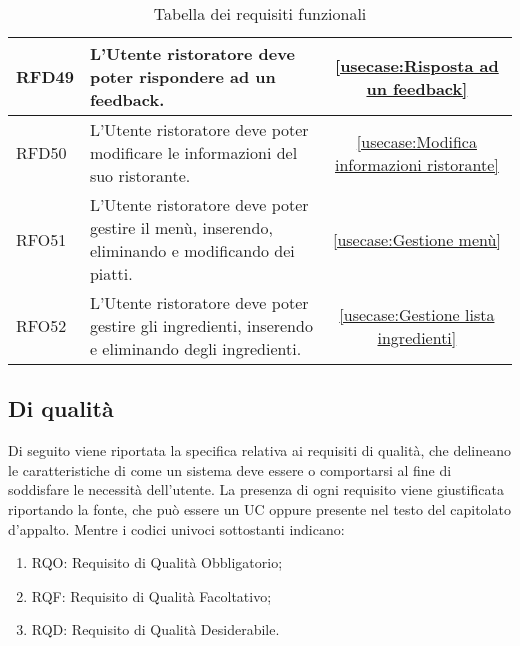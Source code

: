 \begin{table}[H]
\begin{tabularx}{\textwidth}{l|X|c}
		\hline
		RFD49       & L'Utente ristoratore deve poter rispondere ad un feedback.                                                              & \autoref{usecase:Risposta ad un feedback}            \\
		\hline
		RFD50       & L'Utente ristoratore deve poter modificare le informazioni del suo ristorante.                                          & \autoref{usecase:Modifica informazioni ristorante}   \\
		\hline
		RFO51       & L'Utente ristoratore deve poter gestire il menù, inserendo, eliminando e modificando dei piatti.                        & \autoref{usecase:Gestione menù}                      \\
		\hline
		RFO52       & L'Utente ristoratore deve poter gestire gli ingredienti, inserendo e eliminando degli ingredienti.                      & \autoref{usecase:Gestione lista ingredienti}         \\
	\end{tabularx}
	\caption{Tabella dei requisiti funzionali}
\end{table}


\subsection{Di qualità}

Di seguito viene riportata la specifica relativa ai requisiti di qualità, che delineano le caratteristiche di come un sistema
deve essere o comportarsi al fine di soddisfare le necessità dell'utente.
La presenza di ogni requisito viene giustificata riportando la fonte, che può essere un UC oppure presente
nel testo del capitolato d'appalto. Mentre i codici univoci sottostanti indicano:
\begin{enumerate}
	\item RQO: Requisito di Qualità Obbligatorio;
	\item RQF: Requisito di Qualità Facoltativo;
	\item RQD: Requisito di Qualità Desiderabile.
\end{enumerate}

